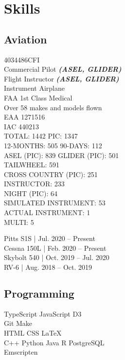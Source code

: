 \documentclass[]{mershon-two-column-resume}
\begin{document}
\begin{minipage}[t]{0.33\textwidth}
		
		\section{Skills}
		
		\subsection{Aviation}
		4034486CFI \\
		Commercial Pilot {\footnotesize \textit{\textbf{(ASEL, GLIDER)}}} \\
		Flight Instructor {\footnotesize \textit{\textbf{(ASEL, GLIDER)}}} \\
		Instrument Airplane \\
		FAA 1st Class Medical \\
		Over 58 makes and models flown \\
		
		EAA 1271516 \\
		IAC 440213 \\
		
		\sectionsep
		TOTAL: 1442 \textbullet{} PIC: 1347 \\
		12-MONTHS: 505 \textbullet{} 90-DAYS: 112 \\
		ASEL (PIC): 839 \textbullet{} GLIDER (PIC): 501 \\
		TAILWHEEL: 591 \\
		CROSS COUNTRY (PIC): 251 \\
		INSTRUCTOR: 233 \\
		NIGHT (PIC): 64 \\
		SIMULATED INSTRUMENT: 53 \\
		ACTUAL INSTRUMENT: 1 \\
		MULTI: 5 \\
				
		\sectionsep
		
		Pitts S1S | Jul. 2020 – Present \\
		Cessna 150L | Feb. 2020 – Present \\
		Skybolt 540 | Oct. 2019 – Jul. 2020 \\
		RV-6 | Aug. 2018 – Oct. 2019 \\
		
		\sectionsep
					
		\subsection{Programming}
		TypeScript \textbullet{} JavaScript \textbullet{} D3 \\
		Git \textbullet{} Make \\
		HTML \textbullet{} CSS \textbullet{} \LaTeX \\
		C++ \textbullet{} Python \textbullet{} Java \textbullet{} R \textbullet{} PostgreSQL \\
		Emscripten
		

\end{minipage}
\end{document}
